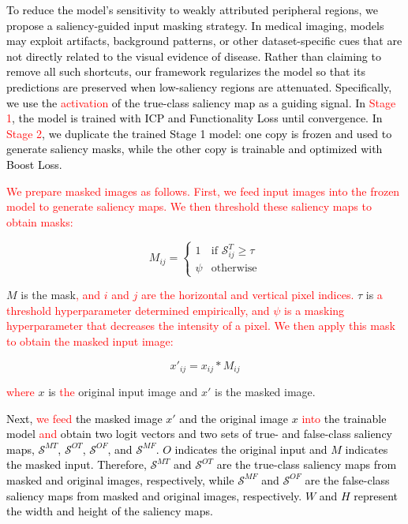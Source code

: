 \documentclass[preprint,7pt, a4paper]{elsarticle}
\begin{document}
\textcolor{black}{To reduce the model's sensitivity to weakly attributed peripheral regions, we propose a saliency-guided input masking strategy. In medical imaging, models may exploit artifacts, background patterns, or other dataset-specific cues that are not directly related to the visual evidence of disease. Rather than claiming to remove all such shortcuts, our framework regularizes the model so that its predictions are preserved when low-saliency regions are attenuated.}
\textcolor{black}{Specifically, we use the \textcolor{red}{activation} of the true-class saliency map as a guiding signal. In \textcolor{red}{Stage 1}, the model is trained with ICP and Functionality Loss until convergence. In \textcolor{red}{Stage 2}, we duplicate the trained Stage 1 model: one copy is frozen and used to generate saliency masks, while the other copy is trainable and optimized with Boost Loss.}

\textcolor{red}{We prepare masked images as follows. First, we feed input images into the frozen model to generate saliency maps. We then threshold these saliency maps to obtain masks:}

\begin{equation}
    M_{ij} = \begin{cases} 
1 & \text{if } \mathcal{S}_{ij}^T \geq \tau \\
\psi & \text{otherwise}
\label{eq:mask}
\end{cases}
\end{equation}

$M$ is the mask\textcolor{red}{, and $i$ and $j$ are the horizontal and vertical pixel indices.} $\tau$ is \textcolor{red}{a threshold hyperparameter determined empirically, and $\psi$ is a masking hyperparameter that decreases the intensity of a pixel. We then apply this mask to obtain the masked input image:}

\begin{equation}
    x'_{ij} = x_{ij} * M_{ij}
    \label{eq7}
\end{equation}

\textcolor{red}{where} $x$ is \textcolor{red}{the} original input image and $x'$ is the masked image.

\textcolor{black}{Next, \textcolor{red}{we feed} the masked image $x'$ and the original image $x$ \textcolor{red}{into} the trainable model \textcolor{red}{and} obtain two logit vectors and two sets of true- and false-class saliency maps, $\mathcal{S}^{MT}$, $\mathcal{S}^{OT}$, $\mathcal{S}^{OF}$, and $\mathcal{S}^{MF}$. $O$ indicates the original input and $M$ indicates the masked input. Therefore, $\mathcal{S}^{MT}$ and $\mathcal{S}^{OT}$ are the true-class saliency maps from masked and original images, respectively, while $\mathcal{S}^{MF}$ and $\mathcal{S}^{OF}$ are the false-class saliency maps from masked and original images, respectively. $W$ and $H$ represent the width and height of the saliency maps.}
\end{document}
